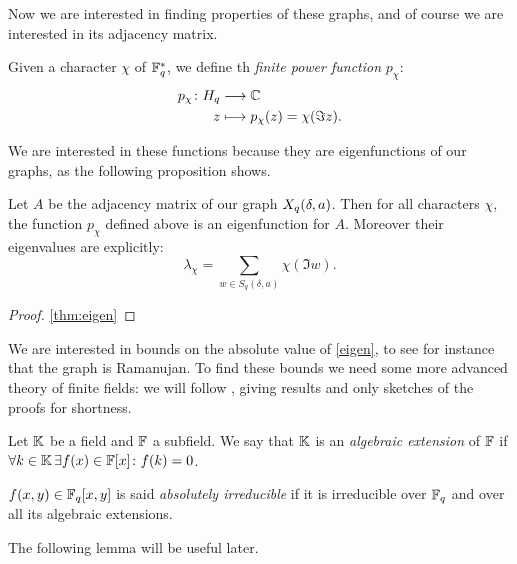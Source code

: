 Now we are interested in finding properties of these graphs, and of course we are interested in its adjacency matrix.
\begin{defn}
	Given a character $\chi$ of ${\mathbb F}_q^{*}$, we define th \emph{finite power function} $p_{\chi}$:
	\begin{align*}
		p_{\chi} \colon H_q & \longrightarrow {\mathbb C} \\
		z & \longmapsto p_{\chi}(z)=\chi (\Im z).
	\end{align*}
\end{defn}
We are interested in these functions because they are eigenfunctions of our graphs, as the following proposition shows.
\begin{prop}
Let $A$ be the adjacency matrix of our graph $X_q (\delta ,a)$. Then for all characters $\chi$, the function $p_{\chi}$
defined above is an eigenfunction for $A$. Moreover their eigenvalues are explicitly:
\begin{equation}\label{eigen}
	\lambda_{\chi}=\sum_{w\in S_q(\delta,a)} \chi (\Im w).
\end{equation}
\begin{proof}\ref{thm:eigen}
\end{proof}
\end{prop}
We are interested in bounds on the absolute value of \ref{eigen}, to see for instance that the graph is Ramanujan. 
To find these bounds we need some more advanced theory of finite fields: we will follow \cite{schmidt1976equations},
giving results and only sketches of the proofs for shortness.
\begin{defn}
Let ${\mathbb K}$ be a field and ${\mathbb F}$ a subfield. We say that ${\mathbb K}$ is an \emph{algebraic extension} of ${\mathbb F}$ if
$\forall k \in {\mathbb K} \, \exists f(x) \in {\mathbb F}[x] \colon f(k)=0$.
\end{defn}
\begin{defn}
$f(x,y)\in {\mathbb F}_q[x,y]$ is said \emph{absolutely irreducible} if it is irreducible over ${\mathbb F}_q$ and over all its algebraic extensions.
\end{defn}
The following lemma will be useful later.

